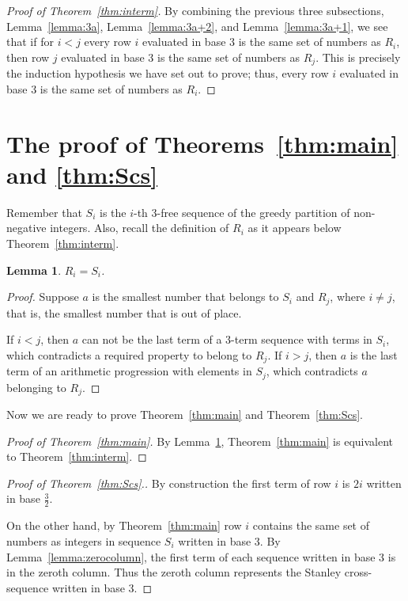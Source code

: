\documentclass[12pt,reqno]{article}
\theoremstyle{plain}
\newtheorem{lemma}[theorem]{Lemma}
\theoremstyle{definition}
\theoremstyle{remark}
\begin{document}
\begin{proof}[Proof of Theorem~\ref{thm:interm}]
By combining the previous three subsections, Lemma~\ref{lemma:3a}, Lemma~\ref{lemma:3a+2}, and Lemma~\ref{lemma:3a+1}, we see that if for $i<j$ every row $i$ evaluated in base 3 is the same set of numbers as $R_i$, then row $j$ evaluated in base 3 is the same set of numbers as $R_j$. This is precisely the induction hypothesis we have set out to prove; thus, every row $i$ evaluated in base 3 is the same set of numbers as $R_i$.
\end{proof}



\section{The proof of Theorems~\ref{thm:main} and \ref{thm:Scs}}\label{sec:twoproofs}

Remember that $S_i$ is the $i$-th 3-free sequence of the greedy partition of non-negative integers. Also, recall the definition of $R_i$ as it appears below Theorem~\ref{thm:interm}.

\begin{lemma} $R_i = S_i$.\label{lemma:RiSi}
\end{lemma}

\begin{proof}
Suppose $a$ is the smallest number that belongs to $S_i$ and $R_j$, where $i \neq j$, that is, the smallest number that is out of place. 

If $i < j$, then $a$ can not be the last term of a 3-term sequence with terms in $S_i$, which contradicts a required property to belong to $R_j$. If $i > j$, then $a$ is the last term of an arithmetic progression with elements in $S_j$, which contradicts $a$ belonging to $R_j$.
\end{proof}

Now we are ready to prove Theorem~\ref{thm:main} and Theorem~\ref{thm:Scs}.

\begin{proof}[Proof of Theorem~\ref{thm:main}]
By Lemma~\ref{lemma:RiSi}, Theorem~\ref{thm:main} is equivalent to Theorem~\ref{thm:interm}.
\end{proof}

\begin{proof}[Proof of Theorem~\ref{thm:Scs}.]
By construction the first term of row $i$ is $2i$ written in base $\frac{3}{2}$.

On the other hand, by Theorem~\ref{thm:main} row $i$ contains the same set of numbers as integers in sequence $S_i$ written in base 3. By Lemma~\ref{lemma:zerocolumn}, the first term of each sequence written in base 3 is in the zeroth column. Thus the zeroth column represents the Stanley cross-sequence written in base 3.
\end{proof}
\end{document}
